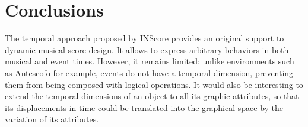 \documentclass{article}
\begin{document}
\section{Conclusions}
The temporal approach proposed by INScore provides an original support to dynamic 
musical score design. It allows to express arbitrary behaviors in both musical and event times.
However, it remains limited: unlike environments such as Antescofo for example, events do not have a temporal dimension, 
preventing them from being composed with logical operations. It would also be interesting to extend the temporal dimensions of an object to all its graphic attributes, so that its displacements in time could be translated into the graphical space by the variation of its attributes.


\balance
%

\end{document}
